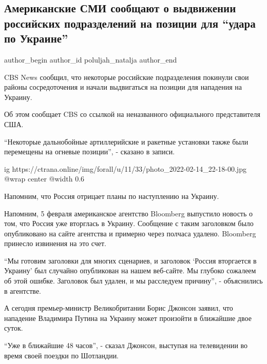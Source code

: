  
 
 
 
 
 
\subsection{Американские СМИ сообщают о выдвижении российских подразделений на позиции для \enquote{удара по Украине}}
\label{sec:14_02_2022.stz.news.ua.strana.2.rossia_armia_usa_smi_udar_po_ukraine}
 
\ifcmt
 author_begin
   author_id poluljah_natalja
 author_end
\fi

CBS News сообщил, что некоторые российские подразделения покинули свои районы
сосредоточения и начали выдвигаться на позиции для нападения на Украину.

Об этом сообщает CBS со ссылкой на неназванного официального представителя США.

\enquote{Некоторые дальнобойные артиллерийские и ракетные установки также были
перемещены на огневые позиции}, - сказано в записи.

\ifcmt
  ig https://ctrana.online/img/forall/u/11/33/photo_2022-02-14_22-18-00.jpg
  @wrap center
  @width 0.6
\fi

Напомним, что Россия отрицает планы по наступлению на Украину.

Напомним, 5 февраля американское агентство Bloomberg выпустило новость о том,
что Россия уже вторглась в Украину. Сообщение с таким заголовком было
опубликовано на сайте агентства и примерно через полчаса удалено. Bloomberg
принесло извинения на это счет.

\enquote{Мы готовим заголовки для многих сценариев, и заголовок \enquote{Россия
вторгается в Украину} был случайно опубликован на нашем веб-сайте. Мы глубоко
сожалеем об этой ошибке. Заголовок был удален, и мы расследуем причину}, -
объяснились в агентстве.

А сегодня премьер-министр Великобритании Борис Джонсон заявил, что нападение
Владимира Путина на Украину может произойти в ближайшие двое суток.

\enquote{Уже в ближайшие 48 часов}, - сказал Джонсон, выступая на телевидении
во время своей поездки по Шотландии.
